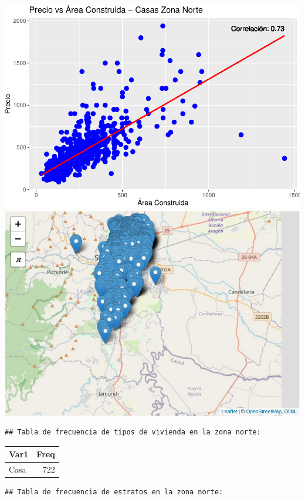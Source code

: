 \documentclass[
]{article}
\begin{document}
\includegraphics{A2_U2_InformeEjecutivo_files/figure-latex/unnamed-chunk-3-1.pdf}
\includegraphics{A2_U2_InformeEjecutivo_files/figure-latex/unnamed-chunk-3-2.pdf}

\begin{verbatim}
## Tabla de frecuencia de tipos de vivienda en la zona norte:
\end{verbatim}

\begin{longtable}[]{@{}lr@{}}
\toprule\noalign{}
Var1 & Freq \\
\midrule\noalign{}
\endhead
\bottomrule\noalign{}
\endlastfoot
Casa & 722 \\
\end{longtable}

\begin{verbatim}
## Tabla de frecuencia de estratos en la zona norte:
\end{verbatim}
\end{document}
